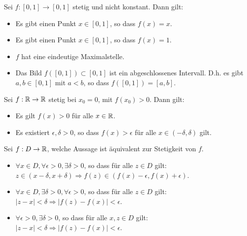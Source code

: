Sei $f : [0,1] \to [0,1]$ stetig und nicht konstant. Dann gilt:
\begin{itemize}
    \item[\rlap{\raisebox{0.3ex}{\hspace{0.4ex}\tiny \ding{52}}}$\square$]
    Es gibt einen Punkt $x \in [0,1]$, so dass $f(x) = x$.
    \item[$\square$]
    Es gibt einen Punkt $x \in [0,1]$, so dass $f(x) = 1$.
    \item[$\square$]
    $f$ hat eine eindeutige Maximalstelle.
    \item[\rlap{\raisebox{0.3ex}{\hspace{0.4ex}\tiny \ding{52}}}$\square$]
    Das Bild $f([0,1]) \subset [0,1]$ ist ein abgeschlossenes Intervall. D.h. es gibt $a,b \in [0,1]$
    mit $a < b$, so dass $f([0,1]) = [a,b]$.
\end{itemize}

Sei $f : \mathbb{R} \to \mathbb{R}$ stetig bei $x_0 = 0$, mit $f(x_0) > 0$. Dann gilt:
\begin{itemize}
    \item[$\square$]
    Es gilt $f(x) > 0$ für alle $x \in \mathbb{R}$.
    \item[\rlap{\raisebox{0.3ex}{\hspace{0.4ex}\tiny \ding{52}}}$\square$]
    Es existiert $\epsilon, \delta > 0$, so dass $f(x) > \epsilon$ für alle $x \in (- \delta, \delta)$ gilt.
\end{itemize}

Sei $f : D \to \mathbb{R}$, welche Aussage ist äquivalent zur Stetigkeit von $f$.
\begin{itemize}
    \item[\rlap{\raisebox{0.3ex}{\hspace{0.4ex}\tiny \ding{52}}}$\square$]
    $\forall x \in D, \forall \epsilon > 0, \exists \delta > 0$, so dass für alle $z \in D$ gilt: $z \in (x - \delta, x + \delta) \Rightarrow f(z) \in (f(x) - \epsilon, f(x) + \epsilon)$.
    \item[$\square$]
    $\forall x \in D, \exists \delta > 0, \forall \epsilon > 0$, so dass für alle $z \in D$ gilt: $|z - x| < \delta \Rightarrow |f(z) - f(x)| < \epsilon$.
    \item[$\square$]
    $\forall \epsilon > 0, \exists \delta > 0$, so dass für alle $x,z \in D$ gilt: $|z - x| < \delta \Rightarrow |f(z) - f(x)| < \epsilon$.
\end{itemize}

